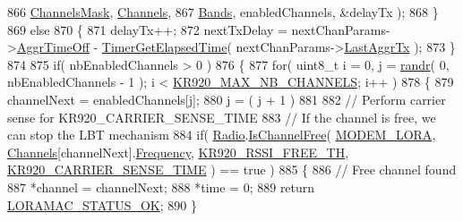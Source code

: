 \begin{DoxyCode}
866                                                       \mbox{\hyperlink{_region_k_r920_8c_a2188957b5ca6af8092154d7ccbfa5757}{ChannelsMask}}, 
      \mbox{\hyperlink{_region_k_r920_8c_aa22cc2ed5f1e155ccf4f0c0388da513e}{Channels}},
867                                                       \mbox{\hyperlink{_region_k_r920_8c_a12f2ea1fb6e7f8812338a8192ce15797}{Bands}}, enabledChannels, &delayTx );
868     \}
869     \textcolor{keywordflow}{else}
870     \{
871         delayTx++;
872         nextTxDelay = nextChanParams->\mbox{\hyperlink{structs_next_chan_params_a3609676d2d3b7c00e25615324b35cb26}{AggrTimeOff}} - 
      \mbox{\hyperlink{time_server_8c_a9ca7e27f3d6474daff63f2e093a2e91e}{TimerGetElapsedTime}}( nextChanParams->\mbox{\hyperlink{structs_next_chan_params_a381b728f60b185ecf3313e974c18768b}{LastAggrTx}} );
873     \}
874 
875     \textcolor{keywordflow}{if}( nbEnabledChannels > 0 )
876     \{
877         \textcolor{keywordflow}{for}( uint8\_t  i = 0, j = \mbox{\hyperlink{utilities_8c_af5d8ad6dae489ac64821e7d4f004595d}{randr}}( 0, nbEnabledChannels - 1 ); i < 
      \mbox{\hyperlink{group___r_e_g_i_o_n_k_r920_ga28705c59a2c19a1de8b22d294fc6bebb}{KR920\_MAX\_NB\_CHANNELS}}; i++ )
878         \{
879             channelNext = enabledChannels[j];
880             j = ( j + 1 ) %
881 
882             \textcolor{comment}{// Perform carrier sense for KR920\_CARRIER\_SENSE\_TIME}
883             \textcolor{comment}{// If the channel is free, we can stop the LBT mechanism}
884             \textcolor{keywordflow}{if}( \mbox{\hyperlink{sx1276mb1las_8c_acf9fe61a72c16fa29a0dc449d23e3820}{Radio}}.\mbox{\hyperlink{struct_radio__s_a4c8c593c3c380636ec2ca7c452d59281}{IsChannelFree}}( \mbox{\hyperlink{radio_8h_a992ef7a5b7f52975ba7bd8dd97740057abeb331e097974ea65b07d74df9e85a8e}{MODEM\_LORA}}, 
      \mbox{\hyperlink{_region_k_r920_8c_aa22cc2ed5f1e155ccf4f0c0388da513e}{Channels}}[channelNext].\mbox{\hyperlink{structs_channel_params_ade3d190636488dad9a89b19446b7acf1}{Frequency}}, \mbox{\hyperlink{group___r_e_g_i_o_n_k_r920_ga5981bd453121b95dfa7c0c6b28d5043b}{KR920\_RSSI\_FREE\_TH}}, 
      \mbox{\hyperlink{group___r_e_g_i_o_n_k_r920_ga723a038e6f34d61637cde94bf5be5e55}{KR920\_CARRIER\_SENSE\_TIME}} ) == true )
885             \{
886                 \textcolor{comment}{// Free channel found}
887                 *channel = channelNext;
888                 *time = 0;
889                 \textcolor{keywordflow}{return} \mbox{\hyperlink{group___l_o_r_a_m_a_c_gga1d18f26b344040b3ec5c3db662919661a03db5fca052313edb3823c014b653a74}{LORAMAC\_STATUS\_OK}};
890             \}

\end{DoxyCode}
